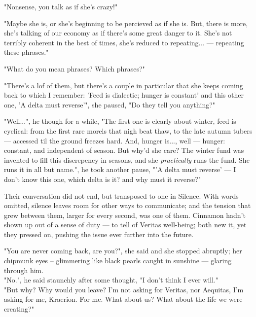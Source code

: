 
"Nonsense, you talk as if she's crazy!"

"Maybe she is, or she's beginning to be percieved as if she is. But, there is more, she's talking of our economy as if there's some great danger to it. She's not terribly coherent in the best of times, she's reduced to repeating... — repeating these phrases."

"What do you mean phrases? Which phrases?"

"There's a lof of them, but there's a couple in particular that she keeps coming back to which I remember: 'Feed is dialectic; hunger is constant' and this other one, 'A delta must reverse'", she paused, "Do they tell you anything?"

"Well...", he though for a while, "The first one is clearly about winter, feed is cyclical: from the first rare morels that nigh beat thaw, to the late autumn tubers — accessed til the ground freezes hard. And, hunger is..., well — hunger: constant, and independent of season. 
But why'd she care? The winter fund was invented to fill this discrepency in seasons, and she \textit{practically} runs the fund. She runs it in all but name.", he took another pause, "'A delta must reverse' — I don't know this one, which delta is it? and why must it reverse?"

Their conversation did not end, but transposed to one in Silence. With words omitted, silence leaves room for other ways to communicate; and the tension that grew between them, larger for every second, was one of them. Cinnamon hadn't shown up out of a sense of duty — to tell of Veritas well-being; both new it, yet they pressed on, pushing the issue ever further into the future.

"You are never coming back, are you?", she said and she stopped abruptly; her chipmunk eyes – glimmering like black pearls caught in sunshine — glaring through him. \\

"No.", he said staunchly after some thought, "I don't think I ever will."\\

"But why? Why would you leave? I'm not asking for Veritas, nor Aequitas, I'm asking for me, Kraerion. For me. What about us? What about the life we were creating?"

